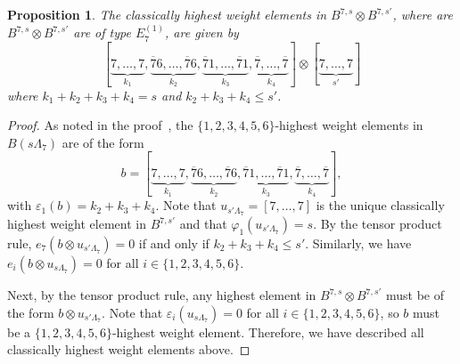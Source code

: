 \documentclass[reqno]{amsart}
\newcommand{\bseven}{\overline{7}}
\theoremstyle{plain}
\newtheorem{prop}[thm]{Proposition}
\theoremstyle{definition}
\numberwithin{equation}{section}
\begin{document}
\begin{prop}
The classically highest weight elements in $B^{7,s} \otimes B^{7,s'}$, where are $B^{7,s} \otimes B^{7,s'}$ are of type $E^{(1)}_7$, are given by
\[
[\underbrace{7, \dotsc, 7}_{k_1}, \underbrace{\bseven6, \dotsc, \bseven6}_{k_2}, \underbrace{\bseven1, \dotsc, \bseven1}_{k_3}, \underbrace{\bseven, \dotsc, \bseven}_{k_4}] \otimes [\underbrace{7, \dotsc, 7}_{s'}]
\]
where $k_1 + k_2 + k_3 + k_4= s$ and $k_2 + k_3 + k_4 \leq s'$.
\end{prop}

\begin{proof}
As noted in the proof~\cite[Lemma~3.1]{JS10}, the $\{1,2,3,4,5,6\}$-highest weight elements in $B(s\Lambda_7)$ are of the form
\[
b = [\underbrace{7, \dotsc, 7}_{k_1}, \underbrace{\bseven6, \dotsc, \bseven6}_{k_2}, \underbrace{\bseven1, \dotsc, \bseven1}_{k_3}, \underbrace{\bseven, \dotsc, \bseven}_{k_4}],
\]
with $\varepsilon_1(b) = k_2 + k_3 + k_4$.
Note that $u_{s'\Lambda_7} = [7, \dotsc, 7]$ is the unique classically highest weight element in $B^{7,s'}$ and that $\varphi_1(u_{s'\Lambda_7}) = s$.
By the tensor product rule, $e_7(b\otimes u_{s'\Lambda_7}) = 0$ if and only if $k_2+k_3 + k_4 \leq s'$.
Similarly, we have $e_i(b\otimes u_{s\Lambda_7}) = 0$ for all $i \in \{1,2,3,4,5,6\}$.

Next, by the tensor product rule, any highest element in $B^{7,s} \otimes B^{7,s'}$ must be of the form $b \otimes u_{s'\Lambda_7}$.
Note that $\varepsilon_i(u_{s\Lambda_7}) = 0$ for all $i \in \{1,2,3,4,5,6\}$, so $b$ must be a $\{1,2,3,4,5,6\}$-highest weight element.
Therefore, we have described all classically highest weight elements above.
\end{proof}









{}
\end{document}
